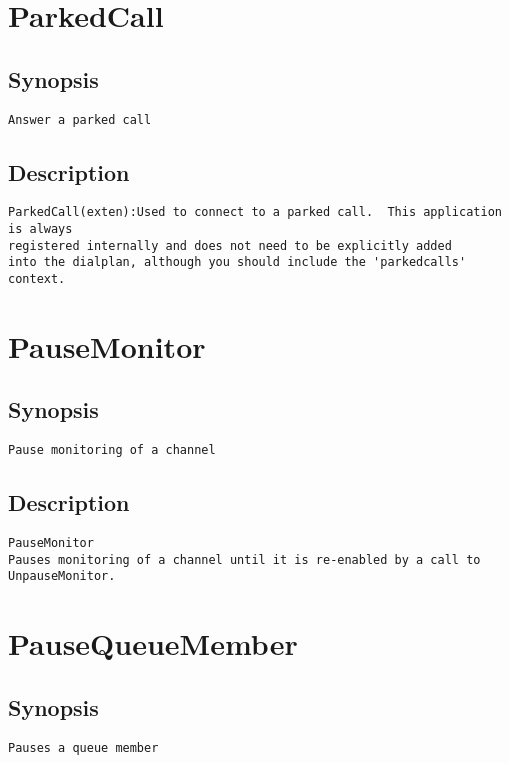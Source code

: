 \section{ParkedCall}
\subsection{Synopsis}
\begin{verbatim}
Answer a parked call
\end{verbatim}
\subsection{Description}
\begin{verbatim}
ParkedCall(exten):Used to connect to a parked call.  This application is always
registered internally and does not need to be explicitly added
into the dialplan, although you should include the 'parkedcalls'
context.

\end{verbatim}


\section{PauseMonitor}
\subsection{Synopsis}
\begin{verbatim}
Pause monitoring of a channel
\end{verbatim}
\subsection{Description}
\begin{verbatim}
PauseMonitor
Pauses monitoring of a channel until it is re-enabled by a call to UnpauseMonitor.

\end{verbatim}


\section{PauseQueueMember}
\subsection{Synopsis}
\begin{verbatim}
Pauses a queue member
\end{verbatim}
